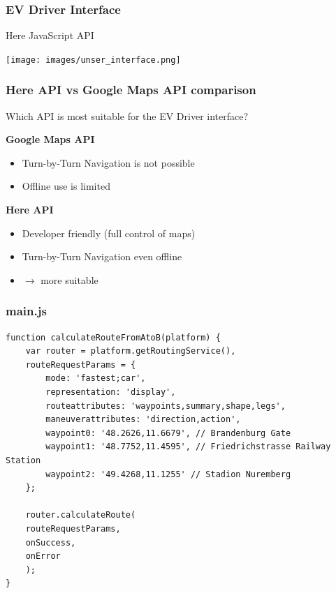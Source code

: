 \begin{frame}
	\frametitle{EV Driver Interface}

	Here JavaScript API

	\vspace*{-3mm}
	\begin{minipage}[t][0cm]{\paperwidth}%
		\hspace*{-\PraesentationSeitenrand}%
		\texttt{[image: images/unser\_interface.png]}
	\end{minipage}

\end{frame}
\clearpage




\begin{frame}
	\frametitle{Here API vs Google Maps API comparison}

	Which API is most suitable for the EV Driver interface?

	\vspace{-8mm}
	\begin{PraesentationAufzaehlung}

		\item \textbf{Google Maps API}
		\begin{itemize}
			\item Turn-by-Turn Navigation is not possible
			\item Offline use is limited
		\end{itemize}

		\item \textbf{Here API}
		\begin{itemize}
			\item Developer friendly (full control of maps)
			\item Turn-by-Turn Navigation even offline
			\item $\rightarrow$ more suitable
		\end{itemize}

	\end{PraesentationAufzaehlung}
\end{frame}
\clearpage




\begin{frame}[fragile]
\frametitle{main.js}

\begin{verbatim}
function calculateRouteFromAtoB(platform) {
    var router = platform.getRoutingService(),
    routeRequestParams = {
        mode: 'fastest;car',
        representation: 'display',
        routeattributes: 'waypoints,summary,shape,legs',
        maneuverattributes: 'direction,action',
        waypoint0: '48.2626,11.6679', // Brandenburg Gate
        waypoint1: '48.7752,11.4595', // Friedrichstrasse Railway Station
        waypoint2: '49.4268,11.1255' // Stadion Nuremberg
    };

    router.calculateRoute(
    routeRequestParams,
    onSuccess,
    onError
    );
}
\end{verbatim}

\end{frame}
\clearpage



